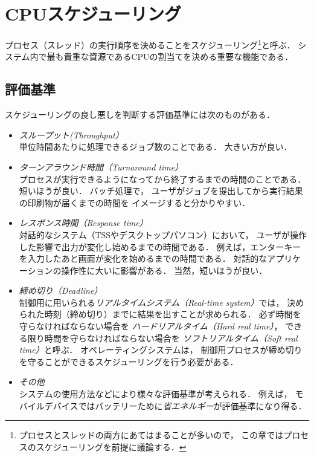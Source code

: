\chapter{CPUスケジューリング}
プロセス（スレッド）の実行順序を決めることをスケジューリング\footnote{
プロセスとスレッドの両方にあてはまることが多いので，
この章ではプロセスのスケジューリングを前提に議論する．}と呼ぶ．
システム内で最も貴重な資源であるCPUの割当てを決める重要な機能である．

\section{評価基準}
スケジューリングの良し悪しを判断する評価基準には次のものがある．

\begin{itemize}
\item \emph{スループット(Throughput）} \\
  単位時間あたりに処理できるジョブ数のことである．
  大きい方が良い．
\item \emph{ターンアラウンド時間（Turnaround time）} \\
  プロセスが実行できるようになってから終了するまでの時間のことである．
  短いほうが良い．
  バッチ処理で，
  ユーザがジョブを提出してから実行結果の印刷物が届くまでの時間を
  イメージすると分かりやすい．
\item \emph{レスポンス時間（Response time）} \\
  対話的なシステム（TSSやデスクトップパソコン）において，
  ユーザが操作した影響で出力が変化し始めるまでの時間である．
  例えば，エンターキーを入力したあと画面が変化を始めるまでの時間である．
  対話的なアプリケーションの操作性に大いに影響がある．
  当然，短いほうが良い．
\item \emph{締め切り（Deadline）} \\
  制御用に用いられる\emph{リアルタイムシステム（Real-time system）}では，
  決められた時刻（締め切り）までに結果を出すことが求められる．
  必ず時間を守らなければならない場合を
  \emph{ハードリアルタイム（Hard real time）}，
  できる限り時間を守らなければならない場合を
  \emph{ソフトリアルタイム（Soft real time）}と呼ぶ．
  オペレーティングシステムは，
  制御用プロセスが締め切りを守ることができるスケジューリングを行う必要がある．
\item \emph{その他} \\
  システムの使用方法などにより様々な評価基準が考えられる．
  例えば，
  モバイルデバイスではバッテリーために\emph{省エネルギー}が評価基準になり得る．
\end{itemize}

